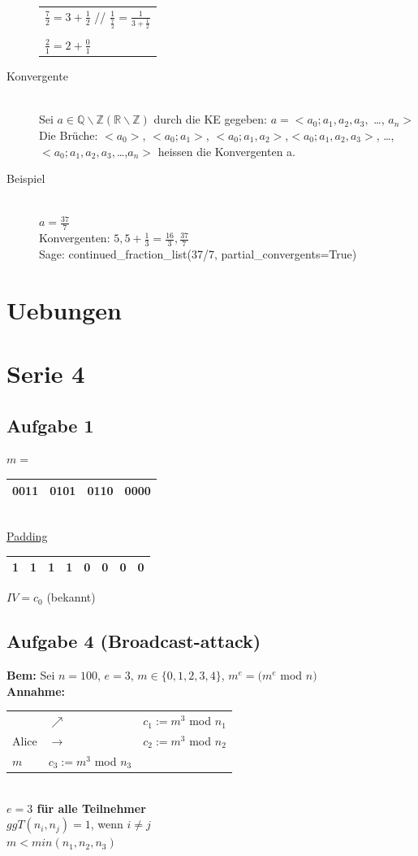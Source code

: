 \documentclass[10pt]{article}
\newcommand{\RN}{\mathbb{R}} %
\newcommand{\QN}{\mathbb{Q}} %
\newcommand{\ZN}{\mathbb{Z}} %
\newcommand{\Bold}[1]{\textbf{#1}} %
\begin{document}
\begin{description}
\begin{tabular}{l}
			$\frac{7}{2}=3+\frac{1}{2}$ // $\frac{1}{\frac{7}{2}}=\frac{1}{3+\frac{1}{2}}$\\\\
			$\frac{2}{1}=2+\frac{0}{1}$ \\
		\end{tabular}  
	\item[Konvergente] \hfill \\
		Sei $a \in \QN \backslash \ZN (\RN \backslash \ZN)$ durch die KE gegeben: $a = <a_0;a_1,a_2,a_3,$ \dots, $a_n>$ \\
		Die Brüche: $<a_0>$, $<a_0;a_1>$, $<a_0;a_1,a_2>$,$<a_0;a_1,a_2,a_3>$, \dots, $<a_0;a_1,a_2,a_3,$\dots,$a_n>$ heissen die Konvergenten a.
	\item[Beispiel] \hfill \\
		$a=\frac{37}{7}$ \\
		Konvergenten: $5, 5+\frac{1}{3}=\frac{16}{3},\frac{37}{7}$ \\
		Sage: continued\_fraction\_list(37/7, partial\_convergents=True)
\end{description}

\newpage
\section{Uebungen}
\section*{Serie 4}
\subsection*{Aufgabe 1}
$m=$\begin{tabular}{|c|c|c|c|}\hline
 0011&0101&0110&0000\\\hline
\end{tabular}\\
\underline{Padding} 
\begin{tabular}{|c|c|c|c|c|c|c|c|}\hline
 1&1&1&1&0&0&0&0\\\hline
\end{tabular} $IV=c_0$ (bekannt)
\subsection*{Aufgabe 4 (Broadcast-attack)}
\Bold{Bem:} Sei $n=100$, $e=3$, $m\in\{0,1,2,3,4\}$, $m^e=(m^e$ mod $n)$\\
\Bold{Annahme:} 
\begin{tabular}{lll}
 &$\nearrow$&$c_1:=m^3$ mod $n_1$\\
 Alice&$\to$&$c_2:=m^3$ mod $n_2$\\
 $m$&$c_3:=m^3$ mod $n_3$
\end{tabular}\\
\Bold{$e=3$ für alle Teilnehmer}\\
$ggT(n_i,n_j)=1$, wenn $i\neq j$\\
$m<min(n_1,n_2,n_3)$
\end{document}
